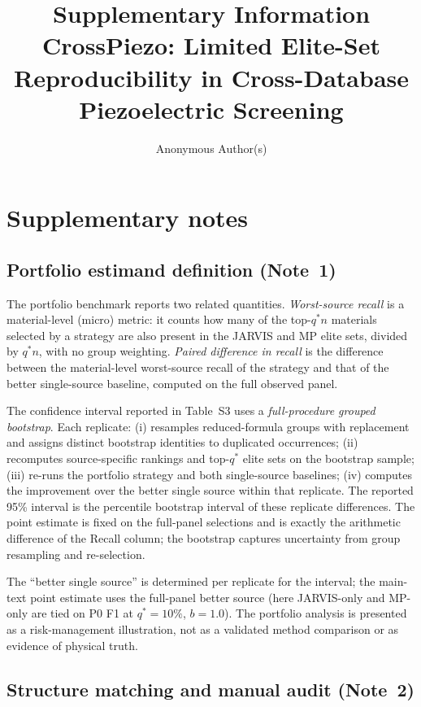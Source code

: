 \documentclass[11pt]{article}
\title{\textbf{Supplementary Information}\\CrossPiezo: Limited Elite-Set Reproducibility in Cross-Database Piezoelectric Screening}
\author{Anonymous Author(s)}
\date{}
\begin{document}
\maketitle

\tableofcontents
\newpage

\section{Supplementary notes}

\subsection{Portfolio estimand definition (Note~1)}

The portfolio benchmark reports two related quantities.
\emph{Worst-source recall} is a material-level (micro) metric: it counts how many of the top-$q^* n$ materials selected by a strategy are also present in the JARVIS and MP elite sets, divided by $q^* n$, with no group weighting.
\emph{Paired difference in recall} is the difference between the material-level worst-source recall of the strategy and that of the better single-source baseline, computed on the full observed panel.

The confidence interval reported in Table~S3 uses a \emph{full-procedure grouped bootstrap}.
Each replicate:
(i) resamples reduced-formula groups with replacement and assigns distinct bootstrap identities to duplicated occurrences;
(ii) recomputes source-specific rankings and top-$q^*$ elite sets on the bootstrap sample;
(iii) re-runs the portfolio strategy and both single-source baselines;
(iv) computes the improvement over the better single source within that replicate.
The reported 95\% interval is the percentile bootstrap interval of these replicate differences.
The point estimate is fixed on the full-panel selections and is exactly the arithmetic difference of the Recall column; the bootstrap captures uncertainty from group resampling and re-selection.

The ``better single source'' is determined per replicate for the interval; the main-text point estimate uses the full-panel better source (here JARVIS-only and MP-only are tied on P0 F1 at $q^*=10\%$, $b=1.0$).
The portfolio analysis is presented as a risk-management illustration, not as a validated method comparison or as evidence of physical truth.

\subsection{Structure matching and manual audit (Note~2)}
\end{document}
